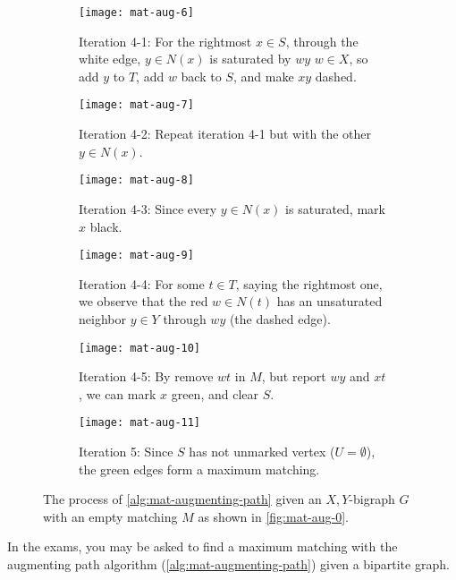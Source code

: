 \documentclass[../src/handouts/main.tex]{subfiles}
\begin{document}
\begin{figure}[htbp]
  \begin{subfigure}[t]{\width}
    \centering
    \texttt{[image: mat-aug-6]}
    \caption{Iteration 4-1: For the rightmost $x \in S$, through the white edge, $y \in N(x)$ is saturated by $wy$ $w \in X$, so add $y$ to $T$, add $w$ back to $S$, and make $xy$ dashed.}
    \label{fig:mat-aug-4-1}
  \end{subfigure}
  \gap
  \begin{subfigure}[t]{\width}
    \centering
    \texttt{[image: mat-aug-7]}
    \caption{Iteration 4-2: Repeat iteration 4-1 but with the other $y \in N(x)$.}
    \label{fig:mat-aug-4-2}
  \end{subfigure}
  \gap
  \begin{subfigure}[t]{\width}
    \centering
    \texttt{[image: mat-aug-8]}
    \caption{Iteration 4-3: Since every $y \in N(x)$ is saturated, mark $x$ black.}
    \label{fig:mat-aug-4-3}
  \end{subfigure}

  \begin{subfigure}[t]{\width}
    \centering
    \texttt{[image: mat-aug-9]}
    \caption{Iteration 4-4: For some $t \in T$, saying the rightmost one, we observe that the red $w \in N(t)$ has an unsaturated neighbor $y \in Y$ through $wy$ (the dashed edge).}
    \label{fig:mat-aug-4-4}
  \end{subfigure}
  \gap
  \begin{subfigure}[t]{\width}
    \centering
    \texttt{[image: mat-aug-10]}
    \caption{Iteration 4-5: By remove $wt$ in $M$, but report $wy$ and $xt$, we can mark $x$ green, and clear $S$.}
    \label{fig:mat-aug-4-5}
  \end{subfigure}
  \gap
  \begin{subfigure}[t]{\width}
    \centering
    \texttt{[image: mat-aug-11]}
    \caption{Iteration 5: Since $S$ has not unmarked vertex ($U = \emptyset$), the green edges form a maximum matching.}
    \label{fig:mat-aug-5}
  \end{subfigure}

  \caption{The process of \cref{alg:mat-augmenting-path} given an $X, Y$-bigraph $G$ with an empty matching $M$ as shown in \cref{fig:mat-aug-0}.}
  \label{fig:mat-aug}
\end{figure}

In the exams, you may be asked to find a maximum matching with the augmenting path algorithm (\cref{alg:mat-augmenting-path}) given a bipartite graph.
\end{document}
